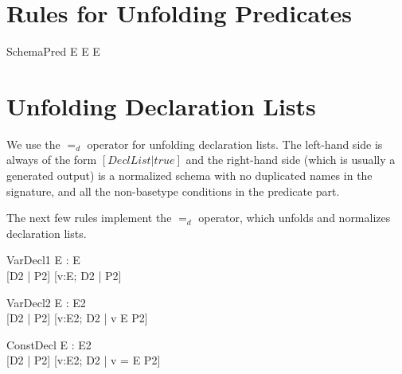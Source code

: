 \documentclass{article}
\newcommand{\declListUnfoldsTo}{\mathrel{=_d}}
\begin{document}
\section{Rules for Unfolding Predicates}

\begin{zedrule}{SchemaPred}
  E \iff \theta E \in E
\end{zedrule}



\section{Unfolding Declaration Lists}

We use the $\declListUnfoldsTo$ operator for unfolding declaration
lists.   The left-hand side is always of the form $[DeclList|true]$
and the right-hand side (which is usually a generated output) is
a normalized schema with no duplicated names in the signature, and
all the non-basetype conditions in the predicate part.

The next few rules implement the $\declListUnfoldsTo$ operator,
which unfolds and normalizes declaration lists.

\begin{zedrule}{VarDecl1}
   \proviso E : \power E \\
   [D1 | true] \declListUnfoldsTo [D2 | P2]
\derives
   [v:E; D1 | true] \declListUnfoldsTo [v:E; D2 |  P2]
\end{zedrule}

\begin{zedrule}{VarDecl2}
   \proviso E : \power E2 \\
   [D1 | true] \declListUnfoldsTo [D2 | P2]
\derives
   [v:E; D1 | true] \declListUnfoldsTo [v:E2; D2 |  v \in E \land P2]
\end{zedrule}

\begin{zedrule}{ConstDecl}
   \proviso E : E2 \\
   [D1 | true] \declListUnfoldsTo [D2 | P2]
\derives
   [v==E; D1 | true] \declListUnfoldsTo [v:E2; D2 |  v = E \land P2]
\end{zedrule}
\end{document}
